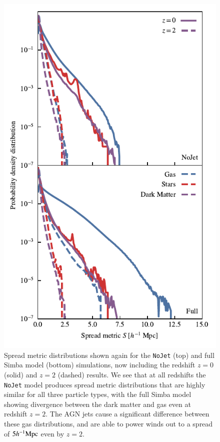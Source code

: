 \documentclass[fleqn,usenatbib]{mnras}
\newcommand{\hmpc}{h^{-1}{\rm Mpc}}
\newcommand{\simba}{{\sc Simba}}
\newcommand{\nojet}{{\tt NoJet}}
\begin{document}
\begin{figure}
    \centering
    \includegraphics[width=\columnwidth]{figures/neighbour_analysis_hist_redshift.pdf}
    \vspace{-0.7cm}
    \caption{Spread metric distributions shown again for the
    \nojet{} (top) and full \simba{} model (bottom) simulations, now including
    the redshift $z=0$ (solid) and $z=2$ (dashed) results. We see that at all
    redshifts the \nojet{} model produces spread metric distributions that
    are highly similar for all three particle types, with the full \simba{}
    model showing divergence between the dark matter and gas even at
    redshift $z=2$. The AGN jets cause a significant difference between
    these gas distributions, and are able to power winds out to a spread of
    $5\hmpc{}$ even by $z=2$.}
    \label{fig:zevodist}
\end{figure}
\end{document}
